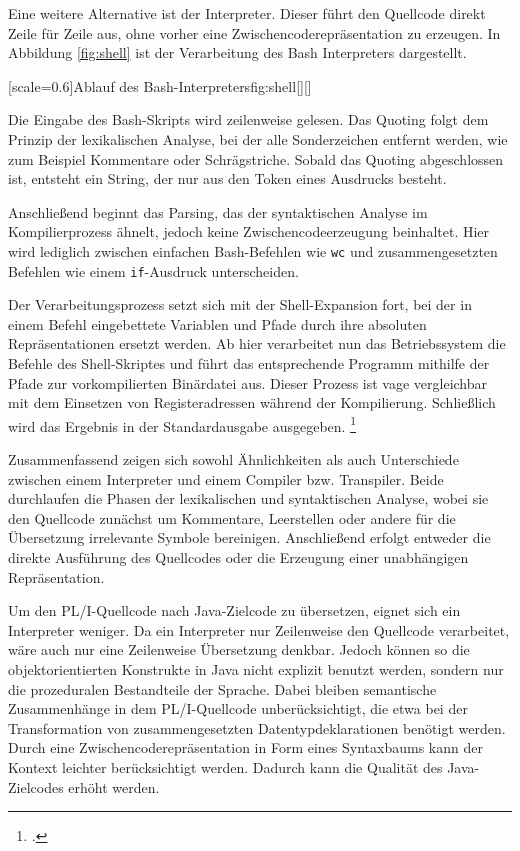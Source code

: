 Eine weitere Alternative ist der Interpreter. Dieser führt den Quellcode direkt Zeile für Zeile aus, ohne vorher eine Zwischencoderepräsentation zu erzeugen. In Abbildung \ref{fig:shell} ist der Verarbeitung des Bash Interpreters dargestellt.


[scale=0.6]{Ablauf des Bash-Interpreters}{fig:shell}[][]
\pagebreak

Die Eingabe des Bash-Skripts wird zeilenweise gelesen. Das Quoting folgt dem Prinzip der lexikalischen Analyse, bei der alle Sonderzeichen entfernt werden, wie zum Beispiel Kommentare oder Schrägstriche. Sobald das Quoting abgeschlossen ist, entsteht ein String, der nur aus den Token eines Ausdrucks besteht.

Anschließend beginnt das Parsing, das der syntaktischen Analyse im Kompilierprozess ähnelt, jedoch keine Zwischencodeerzeugung beinhaltet. Hier wird lediglich zwischen einfachen Bash-Befehlen wie \verb+wc+ und zusammengesetzten Befehlen wie einem \verb+if+-Ausdruck unterscheiden.

Der Verarbeitungsprozess setzt sich mit der Shell-Expansion fort, bei der in einem Befehl eingebettete Variablen und Pfade durch ihre absoluten Repräsentationen ersetzt werden.
Ab hier verarbeitet nun das Betriebssystem die Befehle des Shell-Skriptes und führt das entsprechende Programm mithilfe der Pfade zur vorkompilierten Binärdatei aus. Dieser Prozess ist vage vergleichbar mit dem Einsetzen von Registeradressen während der Kompilierung.
Schließlich wird das Ergebnis in der Standardausgabe ausgegeben. \footcite[Vgl. ][]{gnubash}


Zusammenfassend zeigen sich sowohl Ähnlichkeiten als auch Unterschiede zwischen einem Interpreter und einem Compiler bzw. Transpiler. Beide durchlaufen die Phasen der lexikalischen und syntaktischen Analyse, wobei sie den Quellcode zunächst um Kommentare, Leerstellen oder andere für die Übersetzung irrelevante Symbole bereinigen. Anschließend erfolgt entweder die direkte Ausführung des Quellcodes oder die Erzeugung einer unabhängigen Repräsentation.

Um den PL/I-Quellcode nach Java-Zielcode zu übersetzen, eignet sich ein Interpreter weniger. Da ein Interpreter nur Zeilenweise den Quellcode verarbeitet, wäre auch nur eine Zeilenweise Übersetzung denkbar. 
Jedoch können so die objektorientierten Konstrukte in Java nicht explizit benutzt werden, sondern nur die prozeduralen Bestandteile der Sprache. Dabei bleiben semantische Zusammenhänge in dem PL/I-Quellcode unberücksichtigt, die etwa bei der Transformation von zusammengesetzten Datentypdeklarationen benötigt werden. 
Durch eine Zwischencoderepräsentation in Form eines Syntaxbaums kann der Kontext leichter berücksichtigt werden. Dadurch kann die Qualität des Java-Zielcodes erhöht werden.

